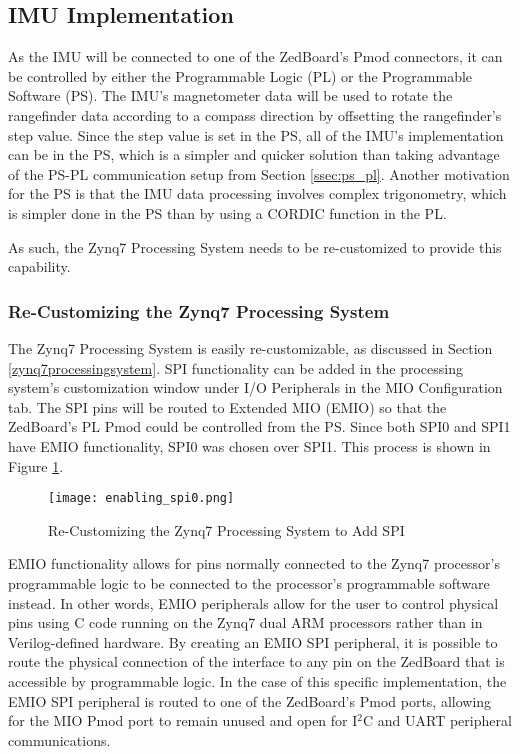 \subsection{IMU Implementation}
As the IMU will be connected to one of the ZedBoard's Pmod connectors, it can be controlled by either the Programmable Logic (PL) or the Programmable Software (PS). The IMU's magnetometer data will be used to rotate the rangefinder data according to a compass direction by offsetting the rangefinder's step value. Since the step value is set in the PS, all of the IMU's implementation can be in the PS, which is a simpler and quicker solution than taking advantage of the PS-PL communication setup from Section \ref{ssec:ps_pl}. Another motivation for the PS is that the IMU data processing involves complex trigonometry, which is simpler done in the PS than by using a CORDIC function in the PL.
\par
As such, the Zynq7 Processing System needs to be re-customized to provide this capability.

\subsubsection{Re-Customizing the Zynq7 Processing System}
The Zynq7 Processing System is easily re-customizable, as discussed in Section \ref{zynq7processingsystem}. SPI functionality can be added in the processing system's customization window under I/O Peripherals in the MIO Configuration tab. The SPI pins will be routed to Extended MIO (EMIO) so that the ZedBoard's PL Pmod could be controlled from the PS. Since both SPI0 and SPI1 have EMIO functionality, SPI0 was chosen over SPI1. This process is shown in Figure \ref{enabling_spi0}.

\begin{figure}[H]
	\centerline{\texttt{[image: enabling\_spi0.png]}}
	\caption{Re-Customizing the Zynq7 Processing System to Add SPI}
	\label{enabling_spi0}
\end{figure}

\par
EMIO functionality allows for pins normally connected to the Zynq7 processor's programmable logic to be connected to the processor's programmable software instead. In other words, EMIO peripherals allow for the user to control physical pins using C code running on the Zynq7 dual ARM processors rather than in Verilog-defined hardware. By creating an EMIO SPI peripheral, it is possible to route the physical connection of the interface to any pin on the ZedBoard that is accessible by programmable logic. In the case of this specific implementation, the EMIO SPI peripheral is routed to one of the ZedBoard's Pmod ports, allowing for the MIO Pmod port to remain unused and open for I$^2$C and UART peripheral communications.







